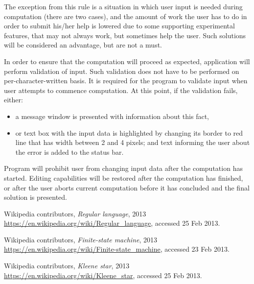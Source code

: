 \documentclass{article}
\begin{document}
The exception from this rule is a situation in which user input is needed during computation (there
are two cases), and the amount of work the user has to do in order to submit his/her help is lowered
due to some supporting experimental features, that may not always work, but sometimes help the user.
Such solutions will be considered an advantage, but are not a must.

In order to ensure that the computation will proceed as expected, application will perform
validation of input. Such validation does not have to be performed on per-character-written basis.
It is required for the program to validate input when user attempts to commence computation. At this
point, if the validation fails, either:

\begin{itemize}

  \item a message window is presented with information about this fact,

  \item or text box with the input data is highlighted by changing its border to red line that has
  width between 2 and 4 pixels; and text informing the user about the error is added to the status
  bar.

\end{itemize}

Program will prohibit user from changing input data after the computation has started. Editing
capabilities will be restored after the computation has finished, or after the user aborts current
computation before it has concluded and the final solution is presented.

\newpage

\begin{thebibliography}{9}

  Wikipedia contributors,
  \emph{Regular language},
  2013
  \url{https://en.wikipedia.org/wiki/Regular_language}, accessed 25 Feb 2013.

  Wikipedia contributors,
  \emph{Finite-state machine},
  2013
  \url{https://en.wikipedia.org/wiki/Finite-state_machine}, accessed 23 Feb 2013.

  Wikipedia contributors,
  \emph{Kleene star},
  2013
  \url{https://en.wikipedia.org/wiki/Kleene_star}, accessed 25 Feb 2013.

\end{thebibliography}
\end{document}
